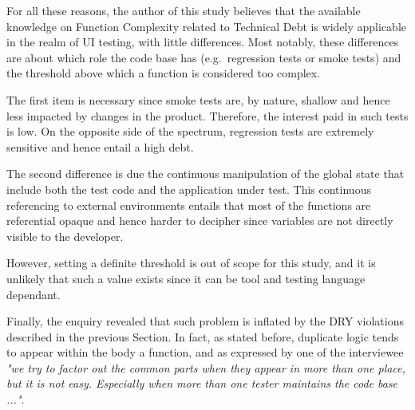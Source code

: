 
    For all these reasons, the author of this study believes that the available knowledge on Function Complexity related to Technical Debt is widely applicable in the realm of UI testing, with little differences. Most notably, these differences are about which role the code base has (e.g.\ regression tests or smoke tests) and the threshold above which a function is considered too complex.


     \label{sec:disc-rq3-function-complexity}
    The first item is necessary since smoke tests are, by nature, shallow and hence less impacted by changes in the product. Therefore, the interest paid in such tests is low. On the opposite side of the spectrum, regression tests are extremely sensitive and hence entail a high debt.

    The second difference is due the continuous manipulation of the global state that include both the test code and the application under test. This continuous referencing to external environments entails that most of the functions are referential opaque \cite{referential_transparency} and hence harder to decipher since variables are not directly visible to the developer.

    However, setting a definite threshold is out of scope for this study, and it is unlikely that such a value exists since it can be tool and testing language dependant.

    Finally, the enquiry revealed that such problem is inflated by the DRY violations described in the previous Section. In fact, as stated before, duplicate logic tends to appear within the body a function, and as expressed by one of the interviewee \textit{"we try to factor out the common parts when they appear in more than one place, but it is not easy. Especially when more than one tester maintains the code base ..."}.



